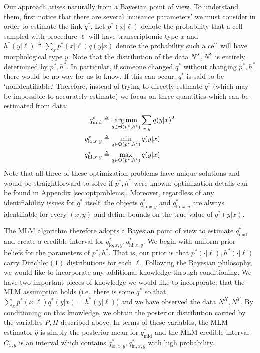 Our approach arises naturally from a Bayesian point of view.  To understand them, first notice that there are several `nuisance parameters' we must consider in order to estimate the link $q^*$.  Let $p^*(x|\ell)$ denote the probability that a cell sampled with procedure $\ell$ will have transcriptomic type $x$ and $h^*(y|\ell) \triangleq \sum_x p^*(x|\ell)q(y|x)$ denote the probability such a cell will have morphological type $y$.  Note that the distribution of the data $N^X,N^Y$ is entirely determined by $p^*,h^*$.   In particular, if someone changed $q^*$ without changing $p^*,h^*$ there would be no way for us to know.  If this can occur, $q^*$ is said to be `nonidentifiable.'   Therefore, instead of trying to directly estimate $q^*$ (which may be impossible to accurately estimate) we focus on three quantities which can be estimated from data:
%
\begin{align*}
q^*_{\mathrm{mid}} &\triangleq \operatorname*{arg\,min}_{q\in \Theta(p^*,h^*)} \sum_{x,y} q(y|x)^2\\
q^*_{\mathrm{lo},x,y} &\triangleq \min_{q\in \Theta(p^*,h^*)} q(y|x) \\
q^*_{\mathrm{hi},x,y} &\triangleq \max_{q\in \Theta(p^*,h^*)} q(y|x) 
\end{align*}
%
Note that all three of these optimization problems have unique solutions and would be straightforward to solve if $p^*,h^*$ were known; optimization details can be found in Appendix \ref{sec:optproblems}.  Moreover, regardless of any identifiability issues for $q^*$ itself, the objects $q^*_{\mathrm{lo},x,y}$ and $q^*_{\mathrm{hi},x,y}$ are always identifiable for every $(x,y)$ and define bounds on the true value of $q^*(y|x)$.

The MLM algorithm therefore adopts a Bayesian point of view to estimate $q^*_{\mathrm{mid}}$ and create a credible interval for $q^*_{\mathrm{lo},x,y},q^*_{\mathrm{hi},x,y}$.  We begin with uniform prior beliefs for the parameters of $p^*,h^*$.  That is, our prior is that $p^*(\cdot|\ell),h^*(\cdot|\ell)$ carry $\mathrm{Dirichlet}(1)$ distributions for each $\ell$.  Following the Bayesian philosophy, we would like to incorporate any additional knowledge through conditioning.  We have two important pieces of knowledge we would like to incorporate: that the MLM assumption holds (i.e.\ there is some $q^*$ so that $\sum_x p^*(x|\ell)q^*(y|x)=h^*(y|\ell)$) and we have observed the data $N^X,N^Y$.  By conditioning on this knowledge, we obtain the posterior distribution carried by the variables $P,H$ described above.  In terms of these variables, the MLM estimator $\hat q$ is simply the posterior mean for $q^*_{\mathrm{mid}}$ and the MLM credible interval $C_{x,y}$ is an interval which contains $q^*_{\mathrm{lo},x,y},q^*_{\mathrm{hi},x,y}$ with high probability.  

